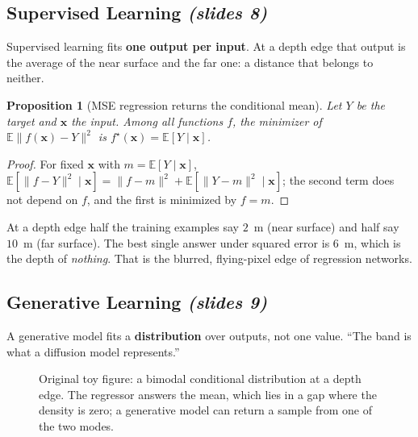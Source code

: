 \documentclass[11pt,a4paper]{article}
\numberwithin{equation}{section}
\newcommand{\slides}[1]{\texorpdfstring{\;\emph{(slides #1)}}{ (slides #1)}}
\newcommand{\E}{\mathbb{E}}
\newcommand{\bx}{\bm{x}}
\theoremstyle{plain}
\newtheorem{proposition}[theorem]{Proposition}
\theoremstyle{definition}
\begin{document}
\subsection{Supervised Learning \slides{8}}
Supervised learning fits \textbf{one output per input}. At a depth edge that output is the average of the near surface and the far one: a distance that belongs to neither.

\begin{proposition}[MSE regression returns the conditional mean]
Let $Y$ be the target and $\bx$ the input. Among all functions $f$, the minimizer of $\E\|f(\bx)-Y\|^2$ is $f^\star(\bx)=\E[Y\mid\bx]$.
\end{proposition}
\begin{proof}
For fixed $\bx$ with $m=\E[Y\mid \bx]$, $\E[\|f-Y\|^2\mid\bx]=\|f-m\|^2+\E[\|Y-m\|^2\mid\bx]$; the second term does not depend on $f$, and the first is minimized by $f=m$.
\end{proof}

\begin{intuition}
At a depth edge half the training examples say $2$~m (near surface) and half say $10$~m (far surface). The best single answer under squared error is $6$~m, which is the depth of \emph{nothing}. That is the blurred, flying-pixel edge of regression networks.
\end{intuition}

\subsection{Generative Learning \slides{9}}
A generative model fits a \textbf{distribution} over outputs, not one value. ``The band is what a diffusion model represents.''

\begin{figure}[H]
\centering
{}
\caption{Original toy figure: a bimodal conditional distribution at a depth edge. The regressor answers the mean, which lies in a gap where the density is zero; a generative model can return a sample from one of the two modes.}
\end{figure}
\end{document}
